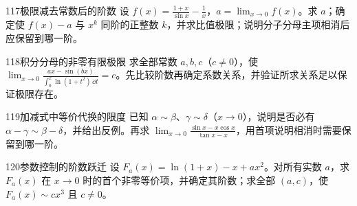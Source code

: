 \begin{exercise}{117}{极限减去常数后的阶数}
设 $f(x)=\frac{1+x}{\sin x}-\frac1x$，$a=\lim_{x\to0}f(x)$。求 $a$；确定使 $f(x)-a$ 与 $x^k$ 同阶的正整数 $k$，并求比值极限；说明分子分母主项相消后应保留到哪一阶。
\end{exercise}
\begin{exercise}{118}{积分分母的非零有限极限}
求全部常数 $a,b,c$（$c\ne0$），使 $\lim_{x\to0}\frac{ax-\sin(bx)}{\int_0^x\ln(1+t^2)\,\dd t}=c$。先比较阶数再确定系数关系，并验证所求关系足以保证极限存在。
\end{exercise}
\begin{exercise}{119}{加减式中等价代换的限度}
已知 $\alpha\sim\beta$、$\gamma\sim\delta$（$x\to0$），说明是否必有 $\alpha-\gamma\sim\beta-\delta$，并给出反例。再求 $\lim_{x\to0}\frac{\sin x-x\cos x}{\tan x-x}$，用首项说明相消时需要保留到哪一阶。
\end{exercise}
\begin{exercise}{120}{参数控制的阶数跃迁}
设 $F_a(x)=\ln(1+x)-x+ax^2$。对所有实数 $a$，求 $F_a(x)$ 在 $x\to0$ 时的首个非零等价项，并确定其阶数；求全部 $(a,c)$，使 $F_a(x)\sim cx^3$ 且 $c\ne0$。
\end{exercise}
